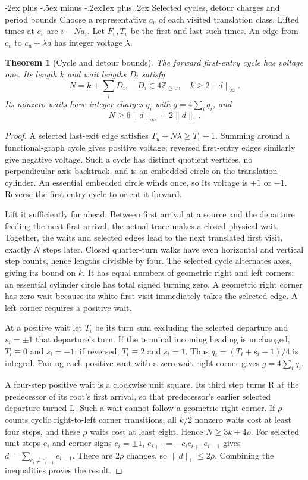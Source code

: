 \documentclass[11pt,letterpaper]{article}
\makeatletter
\renewcommand\section{\@startsection{section}{1}{\z@}%
  {-2ex plus -.5ex minus -.2ex}{1ex plus .2ex}%
  {\normalfont\Large\bfseries}}
\newtheorem{theorem}{Theorem}[section]
\newcommand{\Z}{\mathbb Z}
\makeatother
\begin{document}
\section{Selected cycles, detour charges and period bounds}
Choose a representative $c_v$ of each visited translation class.
Lifted times at $c_v$ are $i-Na_i$. Let $F_v,T_v$ be the first and
last such times. An edge from $c_v$ to $c_u+\lambda d$ has integer
voltage $\lambda$.

\begin{theorem}[Cycle and detour bounds]\label{thm:period}
The forward first-entry cycle has voltage one. Its length $k$ and
wait lengths $D_i$ satisfy
\[
N=k+\sum_iD_i,\quad D_i\in4\Z_{\ge0},\quad
k\ge2\|d\|_\infty.
\]
Its nonzero waits have integer charges $q_i$ with
$g=4\sum_iq_i$, and
\[
\boxed{N\ge6\|d\|_\infty+2\|d\|_1.}
\]
\end{theorem}
\begin{proof}
A selected last-exit edge satisfies $T_u+N\lambda\ge T_v+1$.
Summing around a functional-graph cycle gives positive voltage; reversed
first-entry edges similarly give negative voltage. Such a cycle has
distinct quotient vertices, no perpendicular-axis backtrack, and is an
embedded circle on the translation cylinder. An essential embedded circle
winds once, so its voltage is $+1$ or $-1$. Reverse the first-entry
cycle to orient it forward.

Lift it sufficiently far ahead. Between first arrival at a source and
the departure feeding the next first arrival, the actual trace makes a
closed physical wait. Together, the waits and selected edges lead to the next translated
first visit, exactly $N$ steps later. Closed quarter-turn
walks have even horizontal and vertical step counts, hence lengths
divisible by four. The selected cycle alternates axes, giving its bound
on $k$. It has equal numbers of geometric right and left corners:
an essential cylinder circle has total signed turning zero. A geometric
right corner has zero wait because its white first visit immediately
takes the selected edge. A left corner requires a positive wait.

At a positive wait let $T_i$ be its turn sum excluding the selected
departure and $s_i=\pm1$ that departure's turn. If the terminal incoming
heading is unchanged, $T_i\equiv0$ and $s_i=-1$; if reversed,
$T_i\equiv2$ and $s_i=1$. Thus
$q_i=(T_i+s_i+1)/4$ is integral. Pairing each positive wait with a
zero-wait right corner gives $g=4\sum_iq_i$.

A four-step positive wait is a clockwise unit square. Its third step
turns R at the predecessor of its root's first arrival, so that
predecessor's earlier selected departure turned L. Such a wait cannot
follow a geometric right corner. If $\rho$ counts cyclic right-to-left
corner transitions, all $k/2$ nonzero waits cost at least four steps,
and these $\rho$ waits cost at least eight. Hence $N\ge3k+4\rho$.
For selected unit steps $e_i$ and corner signs $c_i=\pm1$,
$e_{i+1}=-c_ic_{i+1}e_{i-1}$ gives
$d=\sum_{c_i\ne c_{i+1}}e_{i-1}$. There are $2\rho$ changes,
so $\|d\|_1\le2\rho$. Combining the inequalities proves the result.
\end{proof}
\end{document}
